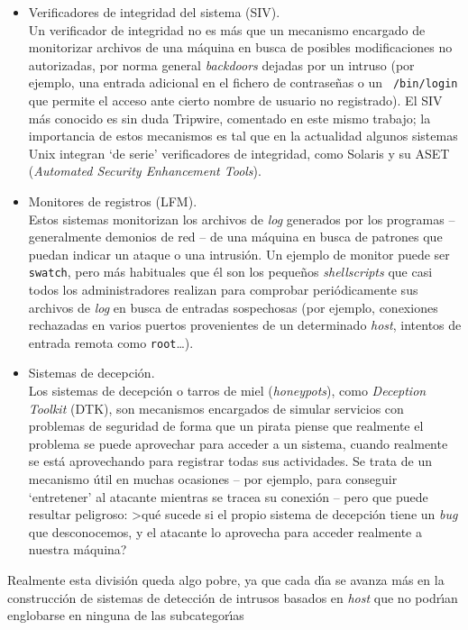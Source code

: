 \begin{itemize}
\item Verificadores de integridad del sistema (SIV).\\
Un verificador de integridad no es m\'as que un mecanismo encargado de 
monitorizar archivos de una m\'aquina en busca de posibles modificaciones no
autorizadas, por norma general {\it backdoors} dejadas por un intruso (por
ejemplo, una entrada adicional en el fichero de contrase\~nas o un {\tt 
/bin/login} que permite el acceso ante cierto nombre de usuario no registrado).
El SIV m\'as conocido es sin duda Tripwire, comentado en este mismo trabajo;
la importancia de estos mecanismos es tal que en la actualidad algunos sistemas 
Unix integran `de serie' verificadores de integridad, como Solaris y su ASET 
({\it Automated Security Enhancement Tools}).
\item Monitores de registros (LFM).\\
Estos sistemas monitorizan los archivos de {\it log} generados por los programas
-- generalmente demonios de red -- de una m\'aquina en busca de patrones que
puedan indicar un ataque o una intrusi\'on. Un ejemplo de monitor puede ser
{\tt swatch}, pero m\'as habituales que \'el son los peque\~nos {\it 
shellscripts} que casi todos los administradores realizan para comprobar
peri\'odicamente sus archivos de {\it log} en busca de entradas sospechosas
(por ejemplo, conexiones rechazadas en varios puertos provenientes de un
determinado {\it host}, intentos de entrada remota como {\tt root}\ldots).
\item Sistemas de decepci\'on.\\
Los sistemas de decepci\'on o tarros de miel ({\it honeypots}), como {\it 
Deception Toolkit} (DTK), son mecanismos
encargados de simular servicios con problemas de seguridad de forma que un 
pirata piense que realmente el problema se puede aprovechar para acceder a un
sistema, cuando realmente se est\'a aprovechando para registrar todas sus
actividades. Se trata de un mecanismo \'util en muchas ocasiones -- por ejemplo,
para conseguir `entretener' al atacante mientras se tracea su conexi\'on --
pero que puede resultar peligroso: >qu\'e sucede si el propio sistema de 
decepci\'on tiene un {\it bug} que desconocemos, y el atacante lo aprovecha para
acceder realmente a nuestra m\'aquina?
\end{itemize}
Realmente esta divisi\'on queda algo pobre, ya que cada d\'{\i}a se avanza m\'as
en la construcci\'on de sistemas de detecci\'on de intrusos basados en {\it 
host} que no podr\'{\i}an englobarse en ninguna de las subcategor\'{\i}as 
